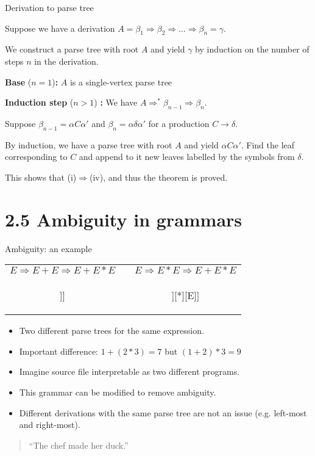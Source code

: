 \documentclass[handout]{beamer}
\begin{document}
\begin{frame}{Derivation to parse tree}

	Suppose we have a derivation $A=\beta_1\Rightarrow\beta_2\Rightarrow\dots\Rightarrow\beta_n=\gamma$. 
	
	We construct a parse tree with root $A$ and yield $\gamma$ by induction on the number of steps $n$ in the derivation.

	\textbf{Base} ($n=1$)\textbf{:} $A$ is a single-vertex parse tree

	\textbf{Induction step} ($n>1$) \textbf{:} We have $A\Rightarrow^*\beta_{n-1}\Rightarrow\beta_n$. 
	
	Suppose $\beta_{n-1}=\alpha C\alpha'$ and $\beta_n=\alpha\delta\alpha'$ for a production $C\to\delta$.


	By induction, we have a parse tree with root $A$ and yield $\alpha C\alpha'$. Find the leaf corresponding to $C$ and append to it new leaves labelled by the symbols from $\delta$.
	
	\bigskip

	This shows that (i)$\Rightarrow$(iv), and thus the theorem is proved. \hfill\qedsymbol
	
\end{frame}


\section{2.5 Ambiguity in grammars}


\begin{frame}{Ambiguity: an example}	

	\bigskip
	\begin{tabular}{c c c}
		$E\Rightarrow E+E\Rightarrow E+E*E$ & \hspace{1em} &
		$E\Rightarrow E*E\Rightarrow E+E*E$ \\
		\begin{forest} 
		[E [E][+][E[E][*][E]]]
		\end{forest}
		& &
		\begin{forest} 
		[E[E[E][+][E]][*][E]]
		\end{forest}
	\end{tabular}
	\begin{itemize}
		\item \alert{Two different parse trees for the same expression.}
		\item Important difference: $1+(2*3)=7 $ but $(1+2)*3=9$
		\item Imagine source file interpretable as two different programs.
		\item This grammar can be modified to remove ambiguity.
		\item Different derivations with the same parse tree are not an issue (e.g. left-most and right-most).
	\end{itemize}

	\bigskip
	\begin{quote}
		\centering
		``The chef made her duck.''
	\end{quote}

\end{frame}
\end{document}

